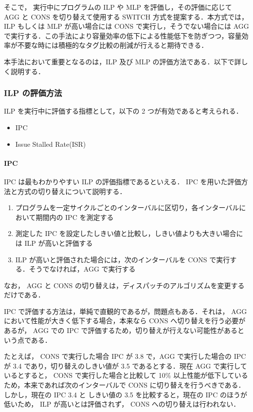 \documentclass[twocolumn]{jsarticle}
\begin{document}
  そこで， 実行中にプログラムの ILP や MLP を評価し，その評価に応じて AGG と CONS を切り替えて使用する SWITCH 方式を提案する．本方式では，ILP もしくは MLP が高い場合には CONS で実行し，そうでない場合には AGG で実行する．この手法により容量効率の低下による性能低下を防ぎつつ，容量効率が不要な時には積極的なタグ比較の削減が行えると期待できる． 

  本手法において重要となるのは，ILP 及び MLP の評価方法である．以下で詳しく説明する．

  \subsubsection{ILP の評価方法}
  \label{sec:switch_ILP}
  ILP を実行中に評価する指標として，以下の 2 つが有効であると考えられる．
  \begin{itemize}
    \item IPC
    \item Issue Stalled Rate(ISR)
  \end{itemize}
  \paragraph{IPC}
  IPC は最もわかりやすい ILP の評価指標であるといえる． IPC を用いた評価方法と方式の切り替えについて説明する．
  \begin{enumerate}
    \item プログラムを一定サイクルごとのインターバルに区切り，各インターバルにおいて期間内の IPC を測定する
    \item 測定した IPC を設定したしきい値と比較し，しきい値よりも大きい場合には ILP が高いと評価する
    \item ILP が高いと評価された場合には，次のインターバルを CONS で実行する．そうでなければ，AGG で実行する
  \end{enumerate}
  なお， AGG と CONS の切り替えは，ディスパッチのアルゴリズムを変更するだけである．

  IPC で評価する方法は，単純で直観的であるが，問題点もある．それは， AGG において性能が大きく低下する場合，本来なら CONS へ切り替えを行う必要があるが， AGG での IPC で評価するため，切り替えが行えない可能性があるという点である．

  たとえば， CONS で実行した場合 IPC が 3.8 で，AGG で実行した場合の IPC が 3.4 であり，切り替えのしきい値が 3.5 であるとする．現在 AGG で実行しているとすると， CONS で実行した場合と比較して 10\% 以上性能が低下しているため，本来であれば次のインターバルで CONS に切り替えを行うべきである．しかし，現在の IPC 3.4 と しきい値の 3.5 を比較すると，現在の IPC のほうが低いため， ILP が高いとは評価されず， CONS への切り替えは行われない．
\end{document}
